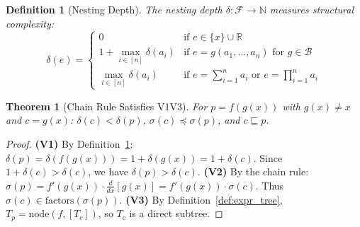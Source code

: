 \documentclass[10pt,a4paper]{amsart}
\newtheorem{definition}{Definition}
\newtheorem{theorem}{Theorem}
\begin{document}
\begin{definition}[Nesting Depth]
\label{def:depth}
The nesting depth $\delta: \mathcal{F} \rightarrow \mathbb{N}$ measures structural complexity:
\begin{equation}
\delta(e) = \begin{cases}
0 & \text{if } e \in \{x\} \cup \mathbb{R} \\[4pt]
1 + \max\limits_{i \in [n]} \delta(a_i) & \text{if } e = g(a_1, \ldots, a_n) \text{ for } g \in \mathcal{B} \\[4pt]
\max\limits_{i \in [n]} \delta(a_i) & \text{if } e = \sum_{i=1}^n a_i \text{ or } e = \prod_{i=1}^n a_i
\end{cases}
\end{equation}
\end{definition}

\begin{theorem}[Chain Rule Satisfies V1\textendash V3]
\label{thm:chain}
For $p = f(g(x))$ with $g(x) \neq x$ and $c = g(x)$: $\delta(c) < \delta(p)$, $\sigma(c) \preceq \sigma(p)$, and $c \sqsubseteq p$.
\end{theorem}

\begin{proof}
\textbf{(V1)} By Definition~\ref{def:depth}: $\delta(p) = \delta(f(g(x))) = 1 + \delta(g(x)) = 1 + \delta(c)$. Since $1 + \delta(c) > \delta(c)$, we have $\delta(p) > \delta(c)$.
\textbf{(V2)} By the chain rule: $\sigma(p) = f'(g(x)) \cdot \frac{d}{dx}[g(x)] = f'(g(x)) \cdot \sigma(c)$. Thus $\sigma(c) \in \text{factors}(\sigma(p))$.
\textbf{(V3)} By Definition~\ref{def:expr_tree}, $T_p = \text{node}(f, [T_c])$, so $T_c$ is a direct subtree.
\end{proof}
\end{document}
